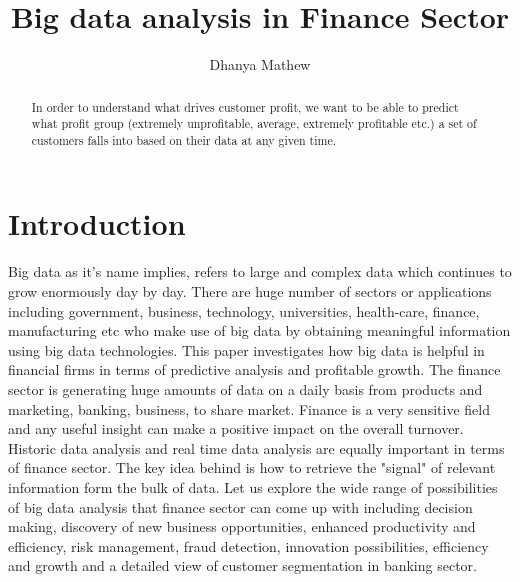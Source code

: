 \documentclass[sigconf]{acmart}
\begin{document}
\title{Big data analysis in Finance Sector}


\author{Dhanya Mathew}

\renewcommand{\shortauthors}{B. Trovato et al.}


\begin{abstract}
In order to understand what drives customer profit, we want to be able to predict what profit group (extremely unprofitable, average, extremely profitable etc.) a set of customers falls into based on their data at any given time.
\end{abstract}



\maketitle

\section{Introduction}

Big data as it's name implies, refers to large and complex data which continues to grow enormously day by day. There are huge number of sectors or applications including government, business, technology, universities, health-care, finance, manufacturing etc who make use of big data by obtaining meaningful information using big data technologies. This paper investigates how big data is helpful in financial firms in terms of predictive analysis and profitable growth. The finance sector is generating huge amounts of data on a daily basis from products and marketing, banking, business, to share market. Finance is a very sensitive field and any useful insight can make a positive impact on the overall turnover. Historic data analysis and real time data analysis are equally important in terms of finance sector. The key idea behind is how to retrieve the "signal" of relevant information form the bulk of data. Let us explore the wide range of possibilities of big data analysis that finance sector can come up with including decision making, discovery of new business opportunities, enhanced productivity and efficiency, risk management, fraud detection, innovation possibilities, efficiency and growth and a detailed view of customer segmentation in banking sector. 
\end{document}
